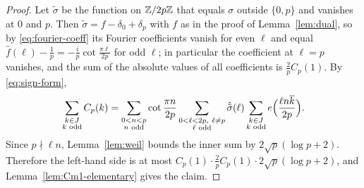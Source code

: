 \begin{proof}
Let $\tilde\sigma$ be the function on $\mathbb{Z}/2p\mathbb{Z}$ that equals $\sigma$ outside $\{0,p\}$ and vanishes at $0$ and $p$.
Then $\tilde\sigma=f-\delta_0+\delta_p$ with $f$ as in the proof of Lemma~\ref{lem:dual}, so by \eqref{eq:fourier-coeff} its Fourier coefficients
vanish for even $\ell$ and equal $\hat f(\ell)-\frac1p=-\frac ip\cot\frac{\pi\ell}{2p}$ for odd $\ell$; in particular
the coefficient at $\ell=p$ vanishes, and the sum of the absolute values of all coefficients is $\frac2pC_p(1)$. By
\eqref{eq:sign-form},
\[
\sum_{\substack{k\in J\\ k\text{ odd}}}C_p(k)=\sum_{\substack{0<n<p\\ n\text{ odd}}}\cot\frac{\pi n}{2p}
\sum_{\substack{0<\ell<2p,\ \ell\ne p\\ \ell\text{ odd}}}\hat{\tilde\sigma}(\ell)
\sum_{\substack{k\in J\\ k\text{ odd}}}e\Bigl(\frac{\ell n\overline{k}}{2p}\Bigr).
\]
Since $p\nmid\ell n$, Lemma~\ref{lem:weil} bounds the inner sum by $2\sqrt p(\log p+2)$. Therefore the left-hand side
is at most $C_p(1)\cdot\frac2pC_p(1)\cdot2\sqrt p(\log p+2)$, and Lemma~\ref{lem:Cm1-elementary} gives the claim.
\end{proof}

